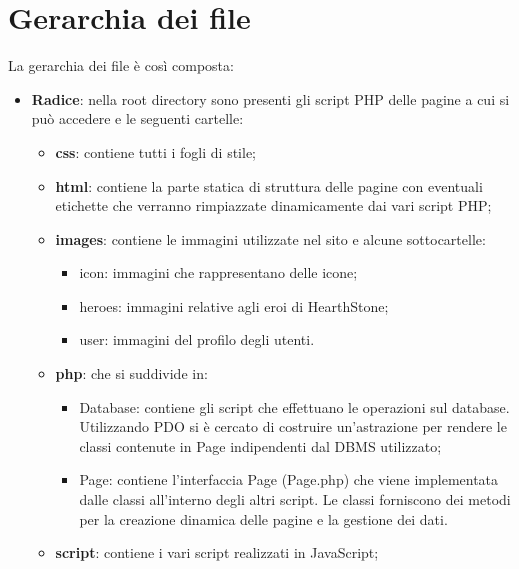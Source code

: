 \section{Gerarchia dei file}
La gerarchia dei file è così composta:
\begin{itemize}
	\item \textbf{Radice}: nella root directory sono presenti gli script PHP delle pagine a cui si può accedere e le seguenti cartelle:
	\begin{itemize}
		\item \textbf{css}: contiene tutti i fogli di stile;
		\item \textbf{html}: contiene la parte statica di struttura delle pagine con eventuali etichette che verranno rimpiazzate dinamicamente dai vari script PHP;
		\item \textbf{images}: contiene le immagini utilizzate nel sito e alcune sottocartelle:
		\begin{itemize}
			\item{icon}: immagini che rappresentano delle icone;
			\item{heroes}: immagini relative agli eroi di HearthStone;
			\item{user}: immagini del profilo degli utenti.
		\end{itemize}
		\item \textbf{php}: che si suddivide in:
		\begin{itemize}
			\item {Database}: contiene gli script che effettuano le operazioni sul database. Utilizzando PDO si è cercato di costruire un'astrazione per rendere le classi contenute in Page indipendenti dal DBMS utilizzato;
			\item {Page}: contiene l'interfaccia Page (Page.php) che viene implementata dalle classi all'interno degli altri script. Le classi forniscono dei metodi per la creazione dinamica delle pagine e la gestione dei dati.
		\end{itemize}
		\item \textbf{script}: contiene i vari script realizzati in JavaScript;
	\end{itemize}
\end{itemize}


\newpage